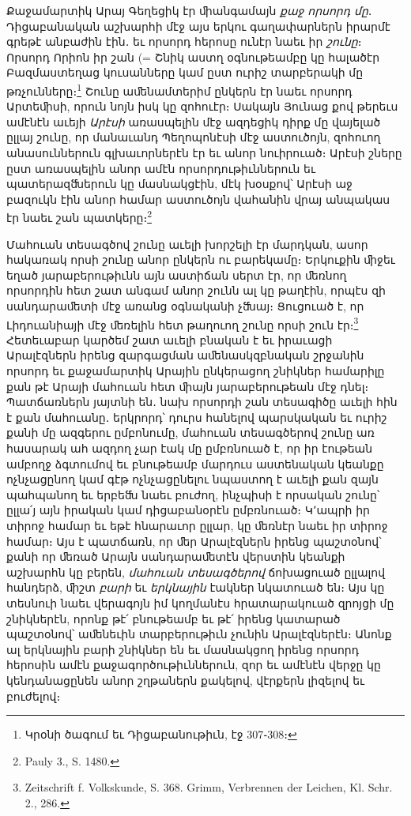 \documentclass{article}
\begin{document}
{Քաջամարտիկ Արայ Գեղեցիկ էր ﬕանգամայն \emph{քաջ որսորդ մը}․ Դիցաբանական աշխարհի մէջ այս երկու գաղափարներն իրարմէ գրեթէ անբաժին էին․ եւ որսորդ հերոսը ունէր նաեւ իր \emph{շունը}։ Որսորդ Որիոն իր շան (= Շնիկ աստղ օգնութեամբը կը հալածէր Բազմաստեղաց կուսանները կամ ըստ ուրիշ տարբերակի մը թռչունները։\footnote{Կրօնի ծագում եւ Դիցաբանութիւն, էջ 307֊308։} Շունը աﬔնամտերիմ ընկերն էր նաեւ որսորդ Արտեﬕսի, որուն նոյն իսկ կը զոհուէր։ Սակայն Յունաց քով թերեւս ամէնէն աւեյի \emph{Արէսի} առասպելին մէջ ազդեցիկ դիրք մը վայելած ըլլայ շունը, որ մանաւանդ Պեղոպոնէսի մէջ աստուծոյն, զոհուող անասուններուն գլխաւորներէն էր եւ անոր նուիրուած։ Արէսի շները ըստ առասպելին անոր ամէն որսորդութիւններուն եւ պատերազﬓերուն կը մասնակցէին, մէկ խօսքով՝ Արէսի աջ բազուկն էին անոր համար աստուծոյն վահանին վրայ անպակաս էր նաեւ շան պատկերը։\footnote{Pauly 3., S. 1480.}

Մահուան տեսագծով շունը աւելի խորշելի էր մարդկան, ասոր հակառակ որսի շունը անոր ընկերն ու բարեկամը։ Երկուքին ﬕջեւ եղած յարաբերութիւնն այն աստիճան սերտ էր, որ ﬔռնող որսորդին հետ շատ անգամ անոր շունն ալ կը թաղէին, որպէս զի սանդարաﬔտի մէջ առանց օգնականի չﬓայ։ Ցուցուած է, որ Լիդուանիայի մէջ ﬔռելին հետ թաղուող շունը որսի շուն էր։\footnote{Zeitschrift f. Volkskunde, S. 368. Grimm, Verbrennen der Leichen, Kl. Schr. 2., 286.} Հետեւաբար կարծեմ շատ աւելի բնական է եւ իրաւացի Արալէզներն իրենց զարգացման աﬔնասկզբնական շրջանին որսորդ եւ քաջամարտիկ Արային ընկերացող շնիկներ համարիլը քան թէ Արայի մահուան հետ ﬕայն յարաբերութեան մէջ դնել։ Պատճառներն յայտնի են․ նախ որսորդի շան տեսագիծը աւելի հին է քան մահուանը․ երկրորդ՝ դուրս հանելով պարսկական եւ ուրիշ քանի մը ազգերու ըմբոնումը, մահուան տեսագծերով շունը առ հասարակ ահ ազդող չար էակ մը ըմբռնուած է, որ իր էութեան ամբողջ ձգտումով եւ բնութեամբ մարդուս աստենական կեանքը ոչնչացընող կամ գէթ ոչնչացընելու նպաստող է աւելի քան զայն պահպանող եւ երբեﬓ նաեւ բուժող, ինչպիսի է որսական շունը՝ ըլլա՛յ այն իրական կամ դիցաբանօրէն ըմբռնուած։ Կ՚ապրի իր տիրոջ համար եւ եթէ հնարաւոր ըլլար, կը ﬔռնէր նաեւ իր տիրոջ համար։ Այս է պատճառն, որ ﬔր Արալէզներն իրենց պաշտօնով՝ քանի որ ﬔռած Արայն սանդարաﬔտէն վերստին կեանքի աշխարհն կը բերեն, \emph{մահուան տեսագծերով} ճոխացուած ըլլալով հանդերձ, ﬕշտ \emph{բարի} եւ \emph{երկնային} էակներ նկատուած են։ Այս կը տեսնուի նաեւ վերագոյն իմ կողմանէս հրատարակուած զրոյցի մը շնիկներէն, որոնք թէ՛ բնութեամբ եւ թէ՛ իրենց կատարած պաշտօնով՝ աﬔնեւին տարբերութիւն չունին Արալէզներէն։ Անոնք ալ երկնային բարի շնիկներ են եւ մասնակցող իրենց որսորդ հերոսին ամէն քաջագործութիւններուն, զոր եւ ամէնէն վերջը կը կենդանացընեն անոր շղթաներն քակելով, վէրքերն լիզելով եւ բուժելով։

}
\end{document}
